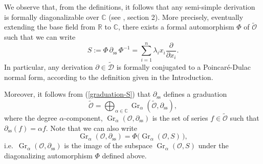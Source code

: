 \documentclass[10pt,twoside,reqno]{amsart}
\theoremstyle{remark}
\theoremstyle{remark}
\newcommand{\C}{\mathbb{C}}
\newcommand{\tmop}[1]{{\operatorname{#1}}}
\newcommand{\Gr}{\operatorname{Gr}}
\newcommand{\tO}{\widetilde{\mathcal{O}}}
\newcommand{\cD}{\mathcal{D}}
\newcommand{\tcD}{\widetilde{\cD}}
\begin{document}
We observe that, from the definitions, it follows that any semi-simple derivation is formally diagonalizable over $\mathbb{C}$ (see \cite{Martinet1981Norm}, section 2). More precisely, eventually extending the base field from $\mathbb{R}$ to $\mathbb{C}$, there exists a formal automorphism $\Phi$ of $\tO$ such that we can write
$$
S := \Phi\, \partial_{\tmop{ss}}\, \Phi^{-1} = \sum_{i=1}^n \lambda_ix_i \frac{\partial}{\partial x_i}.
$$ 
In particular, any derivation $\partial \in \tcD$ is formally conjugated to a Poincar\' e-Dulac normal form, according to the definition given in the Introduction. 

Moreover, it follows from (\ref{graduation-S}) that $\partial_{\tmop{ss}}$ defines a graduation
\begin{equation}\label{graduation-partialss}
\tO = \bigoplus_{\alpha \in \C} \Gr_{\alpha}(\tO, \partial_{\tmop{ss}}),
\end{equation}
where the degree $\alpha$-component, $\Gr_{\alpha}(\mathcal O, \partial_{\tmop{ss}})$ is the set of series $f \in \tO$ such that $\partial_{\tmop{ss}}(f) = \alpha f$. Note that we can also write 
$$\Gr_{\alpha}(\mathcal O, \partial_{\tmop{ss}}) = \Phi\big( \Gr_{\alpha}(\mathcal O, S)\, \big),$$
i.e.~$\Gr_{\alpha}(\mathcal O, \partial_{\tmop{ss}})$ is the image of the subspace $\Gr_{\alpha}(\mathcal O, S)$ under the diagonalizing automorphism $\Phi$ defined above. 
\end{document}
